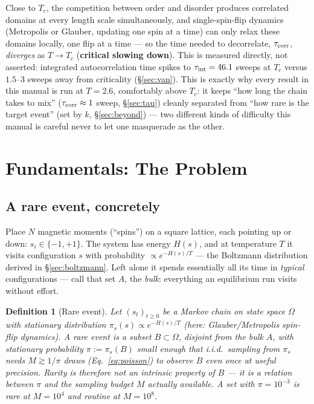 \documentclass[11pt,a4paper]{article}
\newtheorem{definition}{Definition}
\begin{document}
Close to $T_c$, the competition between order and disorder produces correlated domains at every
length scale simultaneously, and single-spin-flip dynamics (Metropolis or Glauber, updating one
spin at a time) can only relax these domains locally, one flip at a time --- so the time needed
to decorrelate, $\tau_{\rm corr}$, \emph{diverges} as $T\to T_c$
(\textbf{critical slowing down}). This is measured directly, not asserted: integrated
autocorrelation time spikes to $\tau_{\rm int}=46.1$ sweeps at $T_c$ versus $1.5$--$3$ sweeps
away from criticality (\S\ref{sec:van}). This is exactly why every result in this manual is run
at $T=2.6$, comfortably above $T_c$: it keeps ``how long the chain takes to mix''
($\tau_{\rm corr}\approx1$ sweep, \S\ref{sec:tau}) cleanly separated from ``how rare is the
target event'' (set by $k$, \S\ref{sec:beyond}) --- two different kinds of difficulty this manual
is careful never to let one masquerade as the other.

\section{Fundamentals: The Problem}\label{sec:problem}

\subsection{A rare event, concretely}
Place $N$ magnetic moments (``spins'') on a square lattice, each pointing up or down:
$s_i\in\{-1,+1\}$. The system has energy $H(s)$, and at temperature $T$ it visits configuration
$s$ with probability $\propto e^{-H(s)/T}$ --- the Boltzmann distribution derived in
\S\ref{sec:boltzmann}. Left alone it spends essentially all its time in \emph{typical}
configurations --- call that set $A$, the \emph{bulk}: everything an equilibrium run visits
without effort.

\begin{definition}[Rare event]\label{def:rare}
Let $(s_t)_{t\ge0}$ be a Markov chain on state space $\Omega$ with stationary distribution
$\pi_s(s)\propto e^{-H(s)/T}$ (here: Glauber/Metropolis spin-flip dynamics). A \emph{rare event}
is a subset $B\subset\Omega$, disjoint from the bulk $A$, with stationary probability
$\pi:=\pi_s(B)$ small enough that i.i.d.\ sampling from $\pi_s$ needs
$M\gtrsim1/\pi$ draws (Eq.~\eqref{eq:poisson}) to observe $B$ even once at useful precision.
Rarity is therefore not an intrinsic property of $B$ --- it is a relation between $\pi$ and the
sampling budget $M$ actually available. A set with $\pi=10^{-3}$ is rare at $M=10^4$ and routine
at $M=10^8$.
\end{definition}
\end{document}
